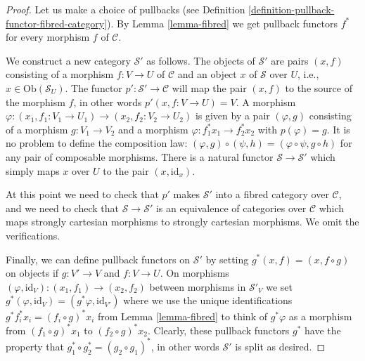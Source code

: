 \begin{proof}
Let us make a choice of pullbacks (see
Definition \ref{definition-pullback-functor-fibred-category}).
By Lemma \ref{lemma-fibred} we get pullback functors $f^*$ for
every morphism $f$ of $\mathcal{C}$.

\medskip\noindent
We construct a new category $\mathcal{S}'$ as follows.
The objects of $\mathcal{S}'$ are pairs $(x, f)$
consisting of a morphism $f : V \to U$ of $\mathcal{C}$
and an object $x$ of $\mathcal{S}$ over $U$, i.e.,
$x\in \text{Ob}(\mathcal{S}_U)$. The functor
$p' : \mathcal{S}' \to \mathcal{C}$ will map the pair $(x, f)$ to the source
of the morphism $f$, in other words $p'(x, f : V\to U) = V$. A morphism
$\varphi : (x_1, f_1: V_1 \to U_1) \to (x_2, f_2 : V_2 \to U_2)$ is given by a
pair $(\varphi, g)$ consisting of a morphism $g : V_1 \to V_2$ and a morphism
$\varphi : f_1^\ast x_1 \to f_2^\ast x_2$ with $p(\varphi) = g$. It is no
problem to define the composition law: $(\varphi, g) \circ (\psi, h) =
(\varphi \circ \psi, g\circ h)$ for any pair of composable morphisms.
There is a natural functor $\mathcal{S} \to \mathcal{S}'$ which simply maps
$x$ over $U$ to the pair $(x, \text{id}_x)$.

\medskip\noindent
At this point we need to check that $p'$ makes $\mathcal{S}'$ into a
fibred category over $\mathcal{C}$, and we need to check that
$\mathcal{S} \to \mathcal{S}'$ is an equivalence of categories over
$\mathcal{C}$ which maps strongly cartesian morphisms to strongly
cartesian morphisms. We omit the verifications.

\medskip\noindent
Finally, we can define pullback functors on $\mathcal{S}'$
by setting $g^\ast(x, f) = (x, f \circ g)$ on objects if
$g : V' \to V$ and $f : V \to U$. On morphisms
$(\varphi, \text{id}_V) : (x_1, f_1) \to (x_2, f_2)$
between morphisms in $\mathcal{S}'_V$ we set $g^\ast(\varphi, \text{id}_V) =
(g^\ast\varphi, \text{id}_{V'})$ where we use the unique identifications
$g^\ast f_i^\ast x_i = (f_i \circ g)^\ast x_i$ from Lemma
\ref{lemma-fibred} to think of $g^\ast\varphi$ as a morphism from
$(f_1 \circ g)^\ast x_1$ to $(f_2 \circ g)^\ast x_2$. Clearly, these pullback
functors $g^\ast$ have the property that
$g_1^\ast \circ g_2^\ast = (g_2\circ g_1)^\ast$, in other words $\mathcal{S}'$
is split as desired.
\end{proof}



















